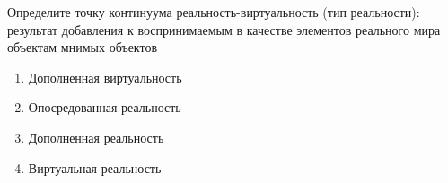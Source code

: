 
Определите точку континуума реальность-виртуальность (тип реальности): результат добавления к воспринимаемым в качестве элементов реального мира объектам мнимых объектов

\begin{enumerate}
    \item Дополненная виртуальность
    \item Опосредованная реальность
    \item Дополненная реальность
    \item Виртуальная реальность
\end{enumerate}

